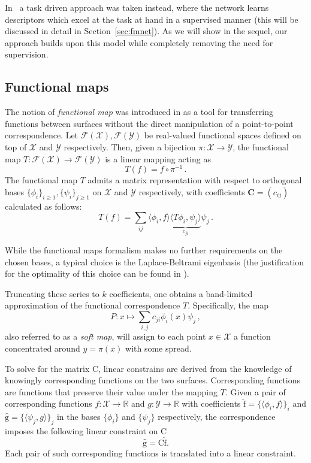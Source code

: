 \documentclass[10pt,twocolumn,letterpaper]{article}
\newcommand{\bb}[1]{\bm{\mathrm{#1}}}
\begin{document}
In~\cite{litany2017deep} a task driven approach was taken instead, where the network learns descriptors which excel at the task at hand in a supervised manner (this will be discussed in detail in Section~\ref{sec:fmnet}). As we will show in the sequel, our approach builds upon this model while completely removing the need for supervision.


\subsection{Functional maps}
The notion of {\em functional map} was introduced in \cite{ovsjanikov12} as a tool for transferring functions between surfaces without the direct manipulation of a point-to-point correspondence. 
Let $\mathcal{F}(\mathcal{X}),\mathcal{F}(\mathcal{Y})$ be real-valued functional spaces defined on top of $\mathcal{X}$ and $\mathcal{Y}$ respectively. Then, given a bijection $\pi:\mathcal{X}\to\mathcal{Y}$, the functional map $T:\mathcal{F}(\mathcal{X})\to\mathcal{F}(\mathcal{Y})$ is a linear mapping acting as
\begin{equation}
    T(f) = f \circ \pi^{-1} \,.
\end{equation}
The functional map $T$ admits a matrix representation with respect to orthogonal bases $\{\phi_i\}_{i\ge 1},\{\psi_i\}_{j\ge 1}$ on $\mathcal{X}$ and $\mathcal{Y}$ respectively, with coefficients $\textbf{C}=(c_{ij})$ calculated as follows:
\begin{equation}
T(f) = \sum_{ij} \langle \phi_i ,f\rangle \underbrace{\langle T \phi_i , \psi_j \rangle}_{c_{ji}}\psi_j\,.
\end{equation}


While the functional maps formalism makes no further requirements on the chosen bases, a typical choice is the Laplace-Beltrami eigenbasis (the justification for the optimality of this choice can be found in
\cite{AflBreKim15}). 

Truncating these series to $k$ coefficients, one obtains a band-limited approximation of the functional correspondence $T$. Specifically, the map
\begin{equation}
P : x \mapsto \sum\limits_{i,j} c_{ji} \phi_i(x) \psi_j\,,
\end{equation}
also referred to as a \emph{soft map}, will assign to each point $x\in\mathcal{X}$ a function concentrated around $y=\pi(x)$ with some spread. 

To solve for the matrix $\bb{C}$, linear constrains are derived from the knowledge of knowingly corresponding functions on the two surfaces. Corresponding functions are functions that preserve their value under the mapping $T$. 
Given a pair of corresponding functions $f:\mathcal{X} \rightarrow \mathbb{R}$ and $g:\mathcal{Y} \rightarrow \mathbb{R}$ with  coefficients $\bb{\hat{f}} = \{ \langle \phi_i,f\rangle \}_i$ and $\bb{\hat{g}} = \{ \langle \psi_j,g\rangle \}_j$ in the bases $\{\phi_i \}$ and  $\{ \psi_j \}$ respectively, 
the correspondence imposes the following linear constraint on $\bb{C}$
\begin{equation}
	\bb{\hat{g}} = \bb{C} \bb{\hat{f}}.
\end{equation}
Each pair of such corresponding functions is translated into a linear constraint.
 
\end{document}
